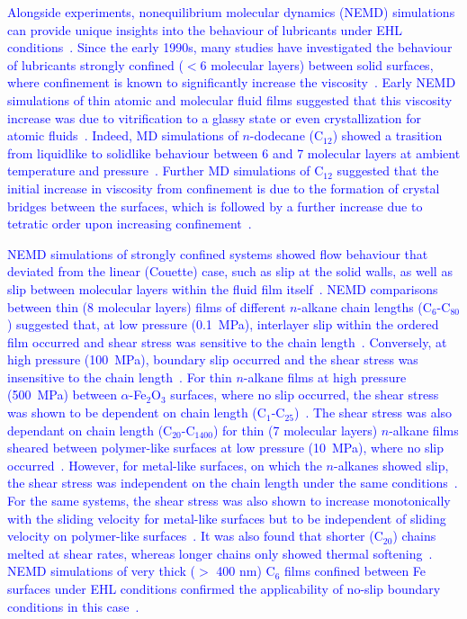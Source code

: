 \documentclass[5p]{elsarticle}
\begin{document}
\textcolor{blue}{Alongside experiments, nonequilibrium molecular dynamics (NEMD) simulations can provide unique insights into the behaviour of lubricants under EHL conditions~\cite{Ewen2018}. Since the early 1990s, many studies have investigated the behaviour of lubricants strongly confined ($< 6$ molecular layers) between solid surfaces, where confinement is known to significantly increase the viscosity~\cite{Granick1991}. Early NEMD simulations of thin atomic and molecular fluid films suggested that this viscosity increase was due to vitrification to a glassy state or even crystallization for atomic fluids~\cite{Thompson1992}. Indeed, MD simulations of $n$-dodecane (C$_{12}$) showed a trasition from liquidlike to solidlike behaviour between 6 and 7 molecular layers at ambient temperature and pressure~\cite{Cui2001}. Further MD simulations of C$_{12}$ suggested that the initial increase in viscosity from confinement is due to the formation of crystal bridges between the surfaces, which is followed by a further increase due to tetratic order upon increasing confinement~\cite{Jabbarzadeh2006,Jabbarzadeh2007}.

NEMD simulations of strongly confined systems showed flow behaviour that deviated from the linear (Couette) case, such as slip at the solid walls, as well as slip between molecular layers within the fluid film itself~\cite{Thompson1990}. NEMD comparisons between thin (8 molecular layers) films of different $n$-alkane chain lengths (C$_6$-C$_{80}$) suggested that, at low pressure (\SI{0.1}{\mega\pascal}), interlayer slip within the ordered film occurred and shear stress was sensitive to the chain length~\cite{Koike1998}. Conversely, at high pressure (\SI{100}{\mega\pascal}), boundary slip occurred and the shear stress was insensitive to the chain length~\cite{Koike1998}. For thin $n$-alkane films at high pressure (\SI{500}{\mega\pascal}) between $\alpha$-Fe$_2$O$_3$ surfaces, where no slip occurred, the shear stress was shown to be dependent on chain length (C$_{1}$-C$_{25}$)~\cite{Savio2013a}. The shear stress was also dependant on chain length (C$_{20}$-C$_{1400}$) for thin (7 molecular layers) $n$-alkane films sheared between polymer-like surfaces at low pressure (\SI{10}{\mega\pascal}), where no slip occurred~\cite{Sivebaek2008}. However, for metal-like surfaces, on which the $n$-alkanes showed slip, the shear stress was independent on the chain length under the same conditions~\cite{Sivebaek2008}. For the same systems, the shear stress was also shown to increase monotonically with the sliding velocity for metal-like surfaces but to be independent of sliding velocity on polymer-like surfaces~\cite{Sivebaek2010}. It was also found that shorter (C$_{20}$) chains melted at shear rates, whereas longer chains only showed thermal softening~\cite{Sivebaek2012}. NEMD simulations of very thick ($>$ 400 nm) C$_{6}$ films confined between Fe surfaces under EHL conditions confirmed the applicability of no-slip boundary conditions in this case~\cite{Washizu2010,Washizu2014}.}
\end{document}
